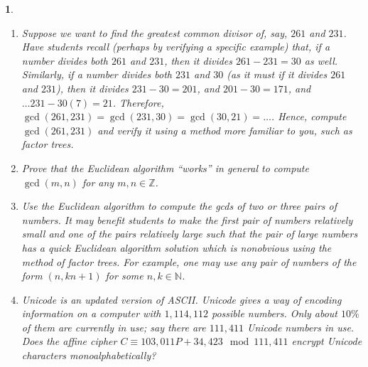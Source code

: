 \documentclass[11pt]{article}
\theoremstyle{plain}
\theoremstyle{remark}
\theoremstyle{definition}
\theoremstyle{definition}
\theoremstyle{definition}
\theoremstyle{plain}
\theoremstyle{plain}
\theoremstyle{plain}
\newtheorem{act}[thm]{\protect\activityname}
\theoremstyle{definition}
\providecommand{\activityname}{Activity}
\begin{document}
\begin{act}
\begin{enumerate}
	\item Suppose we want to find
the greatest common divisor of, say, $261$ and $231$. Have students
recall (perhaps by verifying a specific example) that, if a number divides
both $261$ and $231$, then it divides $261-231=30$ as well. Similarly,
if a number divides both $231$ and $30$ (as it must if it divides
$261$ and $231$), then it divides $231-30=201$, and $201-30=171$,
and$\dots231-30(7)=21$. Therefore, $\gcd(261,231)=\gcd(231,30)=\gcd(30,21)=\dots$. Hence, compute $\gcd(261,231)$ and verify it using a method more familiar to you, such as factor trees. 
\item Prove that the Euclidean algorithm ``works'' in
general to compute $\gcd(m,n)$ for any $m,n\in\mathbb{Z}$.
	\item Use the Euclidean algorithm to compute the gcds of two or three pairs of numbers. It may benefit students to make the first pair of numbers relatively small and one of the pairs relatively large such that the pair of large numbers has a quick Euclidean algorithm solution which is nonobvious using the method of factor trees. For example, one may use any pair of numbers of the form $(n,kn+1)$ for some $n,k\in\mathbb{N}$.
	\item Unicode is an updated version of ASCII. Unicode gives a way of encoding information on a computer with $1,114,112$ possible numbers. Only about $10\%$ of them are currently in use; say there are $111,411$ Unicode numbers in use. Does the affine cipher $C\equiv103,011P+34,423\mod111,411$ encrypt Unicode characters monoalphabetically?

\end{enumerate}
	
\end{act}
\end{document}
